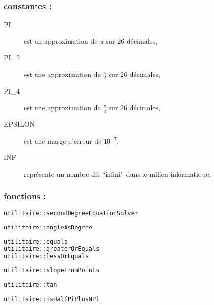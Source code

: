 \documentclass[a4paper,11pt]{report}
\begin{document}
\subsubsection{constantes :}
\begin{description}
	\item[PI] est un approximation de $\pi$ sur 26 décimales,
	\item[PI\_2] est une approximation de $\frac{\pi}{2}$ sur 26 décimales,
	\item[PI\_4] est une approximation de $\frac{\pi}{4}$ sur 26 décimales,
	\item[EPSILON] est une marge d'erreur de $10^{-7}$,
	\item[INF] représente un nombre dit ``infini'' dans le milieu informatique.
\end{description}
\subsubsection{fonctions :}
\begin{lstlisting}[title=Resolution d'équation du second degre,frame=single,language=C++]
utilitaire::secondDegreeEquationSolver
\end{lstlisting}
\begin{lstlisting}[title=Transforme un angle exprime en radian en un angle
exprime en degres,frame=single,language=C++]
utilitaire::angleAsDegree
\end{lstlisting}
\begin{lstlisting}[title=Permet de tester l egalite ou l inegalite entre deux 
nombre reels a un Epsilon d erreur,frame=single,language=C++]
utilitaire::equals
utilitaire::greaterOrEquals
utilitaire::lessOrEquals
\end{lstlisting}
\begin{lstlisting}[title=Permet de trouver le coefficiant angulaire a partir de deux points'',frame=single,language=C++]
utilitaire::slopeFromPoints
\end{lstlisting}
\begin{lstlisting}[title=Permet de trouver la valeur tangante d'un angle 
	en radian mais aussi de retourner une valeur particuliere pour la tangante de
$\pi/2$,frame=single,language=C++]
utilitaire::tan
\end{lstlisting}
\begin{lstlisting}[title=Permet de savoir si $\alpha$ vaut  $\frac{\pi}{2} + n *
\pi\ n \in \mathbb{N}$,frame=single,language=C++]
utilitaire::isHalfPiPlusNPi
\end{lstlisting}
\end{document}
